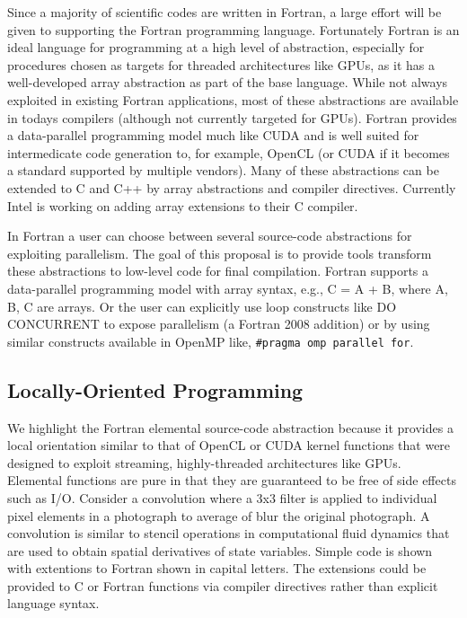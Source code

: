 Since a majority of scientific codes are written in Fortran, a large effort will
be given to supporting the Fortran programming language.  Fortunately Fortran is
an ideal language for programming at a high level of abstraction, especially for
procedures chosen as targets for threaded architectures like GPUs, as it has a
well-developed array abstraction as part of the base language.  While not always
exploited in existing Fortran applications, most of these abstractions are
available in todays compilers (although not currently targeted for GPUs).
Fortran provides a data-parallel programming model much like CUDA and is well
suited for intermedicate code generation to, for example, OpenCL (or CUDA if it
becomes a standard supported by multiple vendors).  Many of these abstractions
can be extended to C and C++ by array abstractions and compiler directives.
Currently Intel is working on adding array extensions to their C compiler.

In Fortran a user can choose between several source-code abstractions for
exploiting parallelism.  The goal of this proposal is to provide tools transform
these abstractions to low-level code for final compilation.  Fortran supports a
data-parallel programming model with array syntax, e.g., C = A + B, where A, B,
C are arrays.  Or the user can explicitly use loop constructs like DO CONCURRENT
to expose parallelism (a Fortran 2008 addition) or by using similar constructs
available in OpenMP like, {\tt #pragma omp parallel for}.

\subsection{Locally-Oriented Programming}

We highlight the Fortran elemental source-code abstraction because it provides a
local orientation similar to that of OpenCL or CUDA kernel functions that were
designed to exploit streaming, highly-threaded architectures like GPUs.
Elemental functions are pure in that they are guaranteed to be free of side
effects such as I/O.  Consider a convolution where a 3x3 filter is applied to
individual pixel elements in a photograph to average of blur the original photograph.
A convolution is similar to stencil operations in computational fluid dynamics that
are used to obtain spatial derivatives of state variables.  Simple code is shown
with extentions to Fortran shown in capital letters.  The extensions could be
provided to C or Fortran functions via compiler directives rather than explicit 
language syntax.

